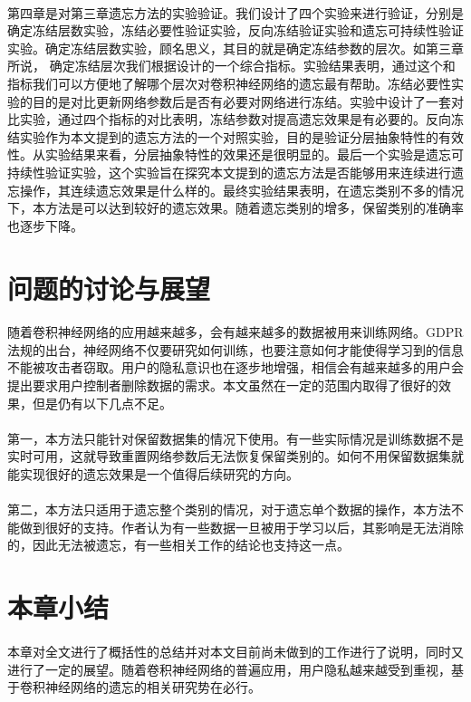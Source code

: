 \paragraph{}第四章是对第三章遗忘方法的实验验证。我们设计了四个实验来进行验证，分别是确定冻结层数实验，冻结必要性验证实验，反向冻结验证实验和遗忘可持续性验证实验。确定冻结层数实验，顾名思义，其目的就是确定冻结参数的层次。如第三章所说， 确定冻结层次我们根据设计的一个综合指标。实验结果表明，通过这个和指标我们可以方便地了解哪个层次对卷积神经网络的遗忘最有帮助。冻结必要性实验的目的是对比更新网络参数后是否有必要对网络进行冻结。实验中设计了一套对比实验，通过四个指标的对比表明，冻结参数对提高遗忘效果是有必要的。反向冻结实验作为本文提到的遗忘方法的一个对照实验，目的是验证分层抽象特性的有效性。从实验结果来看，分层抽象特性的效果还是很明显的。最后一个实验是遗忘可持续性验证实验，这个实验旨在探究本文提到的遗忘方法是否能够用来连续进行遗忘操作，其连续遗忘效果是什么样的。最终实验结果表明，在遗忘类别不多的情况下，本方法是可以达到较好的遗忘效果。随着遗忘类别的增多，保留类别的准确率也逐步下降。
\section{问题的讨论与展望}
\paragraph{}随着卷积神经网络的应用越来越多，会有越来越多的数据被用来训练网络。GDPR法规的出台，神经网络不仅要研究如何训练，也要注意如何才能使得学习到的信息不能被攻击者窃取。用户的隐私意识也在逐步地增强，相信会有越来越多的用户会提出要求用户控制者删除数据的需求。本文虽然在一定的范围内取得了很好的效果，但是仍有以下几点不足。
\paragraph{}第一，本方法只能针对保留数据集的情况下使用。有一些实际情况是训练数据不是实时可用，这就导致重置网络参数后无法恢复保留类别的。如何不用保留数据集就能实现很好的遗忘效果是一个值得后续研究的方向。
\paragraph{}第二，本方法只适用于遗忘整个类别的情况，对于遗忘单个数据的操作，本方法不能做到很好的支持。作者认为有一些数据一旦被用于学习以后，其影响是无法消除的，因此无法被遗忘，有一些相关工作\cite{2018arXiv181205159T}的结论也支持这一点。
\section{本章小结}
\paragraph{}本章对全文进行了概括性的总结并对本文目前尚未做到的工作进行了说明，同时又进行了一定的展望。随着卷积神经网络的普遍应用，用户隐私越来越受到重视，基于卷积神经网络的遗忘的相关研究势在必行。
